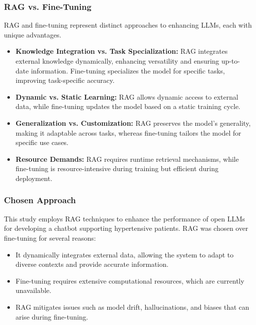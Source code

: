 \subsubsection{\gls{RAG} vs. Fine-Tuning}
\gls{RAG} and fine-tuning represent distinct approaches to enhancing \glspl{LLM}, each with unique advantages.
%
\begin{itemize}
    \item \textbf{Knowledge Integration vs. Task Specialization:} \gls{RAG} integrates external knowledge dynamically, enhancing versatility and ensuring up-to-date information.
    Fine-tuning specializes the model for specific tasks, improving task-specific accuracy.
    \item \textbf{Dynamic vs. Static Learning:} \gls{RAG} allows dynamic access to external data, while fine-tuning updates the model based on a static training cycle.
    \item \textbf{Generalization vs. Customization:} \gls{RAG} preserves the model's generality, making it adaptable across tasks, whereas fine-tuning tailors the model for specific use cases.
    \item \textbf{Resource Demands:} \gls{RAG} requires runtime retrieval mechanisms, while fine-tuning is resource-intensive during training but efficient during deployment.
\end{itemize}

\subsubsection{Chosen Approach}
%

%
This study employs \gls{RAG} techniques to enhance the performance of open \glspl{LLM} for developing a chatbot supporting hypertensive patients.
%
\gls{RAG} was chosen over fine-tuning for several reasons:
%
\begin{itemize}
    \item It dynamically integrates external data, allowing the system to adapt to diverse contexts and provide accurate information.
    \item Fine-tuning requires extensive computational resources, which are currently unavailable.
    \item \gls{RAG} mitigates issues such as model drift, hallucinations, and biases that can arise during fine-tuning.
\end{itemize}

